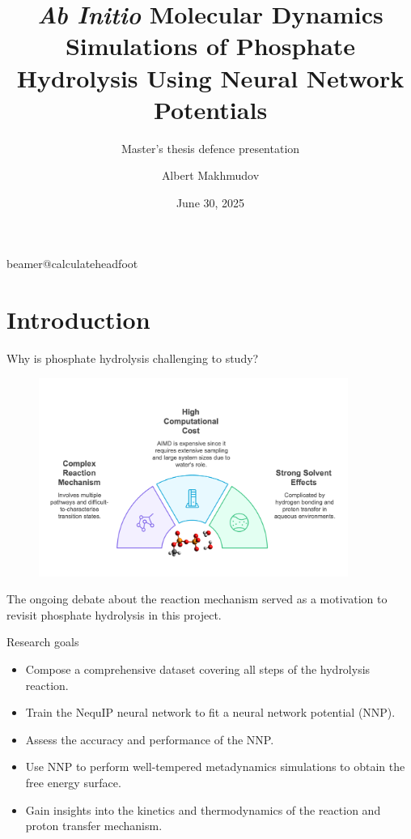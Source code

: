 \documentclass[11pt,t]{beamer}
\title[`AIMD' Simulations of Phosphate Hydrolysis Using NNPs]{\textit{Ab Initio} Molecular Dynamics Simulations of Phosphate Hydrolysis Using Neural Network Potentials} %
\subtitle{Master's thesis defence presentation}
\author{Albert Makhmudov}
\institute{Supervisor: Prof. J. Harvey}
\date{June 30, 2025}
\begin{document}
\csname beamer@calculateheadfoot\endcsname %



\begin{frame}
	\titlepage
\end{frame}



\section{Introduction}
\begin{frame}{Why is phosphate hydrolysis challenging to study?}
	\vspace{-30pt}
	\begin{figure}
		\centering
		\includegraphics[width=0.9\textwidth]{Figures/introduction_background.png}
	\end{figure}
	\vspace{-10pt}
	\small
	The ongoing debate about the reaction mechanism served as a motivation to revisit phosphate hydrolysis in this project.
\end{frame}



\begin{frame}{Research goals}
	\small
	\begin{itemize}
		\item Compose a comprehensive dataset covering all steps of the hydrolysis reaction.
		\item Train the NequIP neural network to fit a neural network potential (NNP).
		\item Assess the accuracy and performance of the NNP.
		\item Use NNP to perform well-tempered metadynamics simulations to obtain the free energy surface.
		\item Gain insights into the kinetics and thermodynamics of the reaction and proton transfer mechanism.
	\end{itemize}	
\end{frame}
\end{document}
